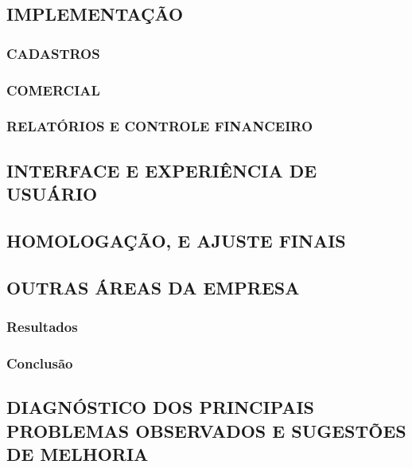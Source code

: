 \documentclass[
  12pt,				%
  openany,
  oneside,
  a4paper,			%
  english,			%
  brazil
]{article}
\numberwithin{figure}{section}
\numberwithin{table}{section}
\begin{document}
\subsection{IMPLEMENTAÇÃO}

  \subsubsection{CADASTROS}
  
  \subsubsection{COMERCIAL}
  
  \subsubsection{RELATÓRIOS E CONTROLE FINANCEIRO}


\subsection{INTERFACE E EXPERIÊNCIA DE USUÁRIO}

\subsection{HOMOLOGAÇÃO, E AJUSTE FINAIS}

\subsection{OUTRAS ÁREAS DA EMPRESA}



\subsubsection{Resultados}
\subsubsection{Conclusão}



\subsection{DIAGNÓSTICO DOS PRINCIPAIS PROBLEMAS OBSERVADOS E SUGESTÕES DE MELHORIA}


\end{document}
